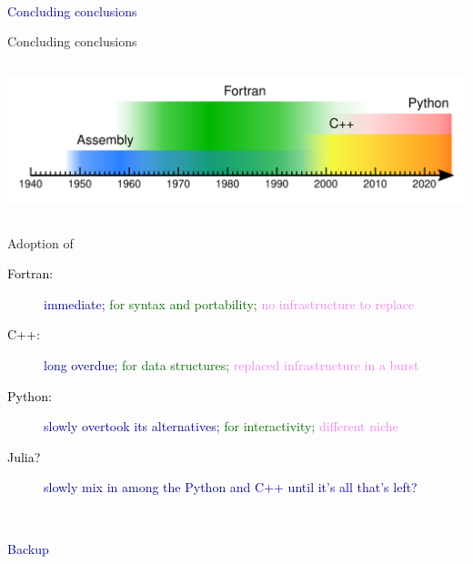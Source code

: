 \documentclass[aspectratio=169]{beamer}
\begin{document}
\begin{frame}{\mbox{ }}
\LARGE
\begin{center}
\textcolor{darkblue}{Concluding conclusions}
\end{center}
\end{frame}

\begin{frame}{Concluding conclusions}
\begin{columns}
\includegraphics[width=\linewidth]{PLOTS/programming-languages.pdf}
\end{columns}

\large
\vspace{0.5 cm}
Adoption of

\begin{description}
\item[\textcolor{black}{Fortran:}] \textcolor{darkblue}{immediate;} \textcolor{darkgreen}{for syntax and portability;} \textcolor{violet}{no infrastructure to replace}
\item[\textcolor{black}{C++:}] \textcolor{darkblue}{long overdue;} \textcolor{darkgreen}{for data structures;} \textcolor{violet}{replaced infrastructure in a burst}
\item[\textcolor{black}{Python:}] \textcolor{darkblue}{slowly overtook its alternatives;} \textcolor{darkgreen}{for interactivity;} \textcolor{violet}{different niche}
\item[\textcolor{black}{Julia?}] \textcolor{darkblue}{slowly mix in among the Python and C++ until it's all that's left?}
\end{description}
\end{frame}

\begin{frame}{\mbox{ }}
\LARGE
\begin{center}
\textcolor{darkblue}{Backup}
\end{center}
\end{frame}
\end{document}

